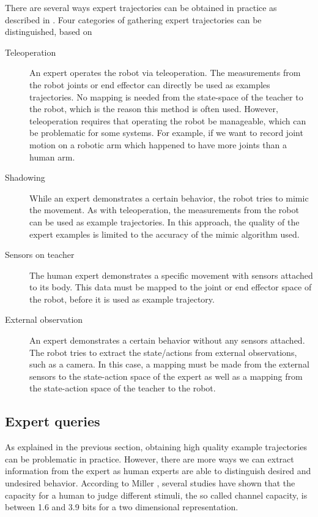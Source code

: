 \documentclass[mscThesis.tex]{subfiles}
\begin{document}
There are several ways expert trajectories can be obtained in practice as described in \cite{Argall2009}. Four categories of gathering expert trajectories can be distinguished, based on

\begin{description}
\item [Teleoperation] An expert operates the robot via teleoperation. The measurements from the robot joints or end effector can directly be used as examples trajectories. No mapping is needed from the state-space of the teacher to the robot, which is the reason this method is often used. However, teleoperation requires that
operating the robot be manageable, which can be problematic for some systems. For example, if we want to record joint motion on a robotic arm which happened to have more joints than a human arm.
\item [Shadowing] While an expert demonstrates a certain behavior, the robot tries to mimic the movement. As with teleoperation, the measurements from the robot can be used as example trajectories. In this approach, the quality of the expert examples is limited to the accuracy of the mimic algorithm used. 
\item [Sensors on teacher] The human expert demonstrates a specific movement with sensors attached to its body. This data must be mapped to the joint or end effector space of the robot, before it is used as example trajectory. 
\item [External observation] An expert demonstrates a certain behavior without any sensors attached. The robot tries to extract the state/actions from external observations, such as a camera. In this case, a mapping must be made from the external sensors to the state-action space of the expert as well as a mapping from the state-action space of the teacher to the robot. 
\end{description}

\subsection{Expert queries}
As explained in the previous section, obtaining high quality example trajectories can be problematic in practice. However, there are more ways we can extract information from the expert as human experts are able to distinguish desired and undesired behavior. According to Miller \cite{miller1956magical}, several studies have shown that the capacity for a human to judge different stimuli, the so called channel capacity, is between 1.6 and 3.9 bits for a two dimensional representation. 
\end{document}

